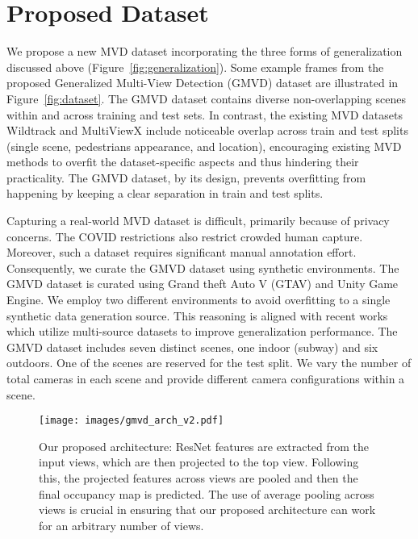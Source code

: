 \documentclass[letterpaper, 10 pt, conference]{ieeeconf}  \usepackage{times}
\begin{document}
\section{Proposed Dataset}






We propose a new MVD dataset incorporating the three forms of generalization discussed above (Figure~\ref{fig:generalization}). Some example frames from the proposed Generalized Multi-View Detection (GMVD) dataset are illustrated in Figure~\ref{fig:dataset}. The GMVD dataset contains diverse non-overlapping scenes within and across training and test sets. In contrast, the existing MVD datasets Wildtrack and MultiViewX include noticeable overlap across train and test splits (single scene, pedestrians appearance, and location), encouraging existing MVD methods to overfit the dataset-specific aspects and thus hindering their practicality. The GMVD dataset, by its design, prevents overfitting from happening by keeping a clear separation in train and test splits.

Capturing a real-world MVD dataset is difficult, primarily because of privacy concerns. The COVID restrictions also restrict crowded human capture. Moreover, such a dataset requires significant manual annotation effort. Consequently, we curate the GMVD dataset using synthetic environments. The GMVD dataset is curated using Grand theft Auto V (GTAV) and Unity Game Engine. We employ two different environments to avoid overfitting to a single synthetic data generation source. This reasoning is aligned with recent works \cite{gong2021mdalu, Zhao_2021_CVPR} which utilize multi-source datasets to improve generalization performance.
The GMVD dataset includes seven distinct scenes, one indoor (subway) and six outdoors. One of the scenes are reserved for the test split. We vary the number of total cameras in each scene and provide different camera configurations within a scene. 


 \begin{figure*}[t]
    \centering
    \texttt{[image: images/gmvd\_arch\_v2.pdf]}
    \caption{Our proposed architecture: ResNet features are extracted from the input views, which are then projected to the top view. Following this, the projected features across views are pooled and then the final occupancy map is predicted. The use of average pooling across views is crucial in ensuring that our proposed architecture can work for an arbitrary number of views. }
    \label{fig:architecture}
\end{figure*}
\end{document}
